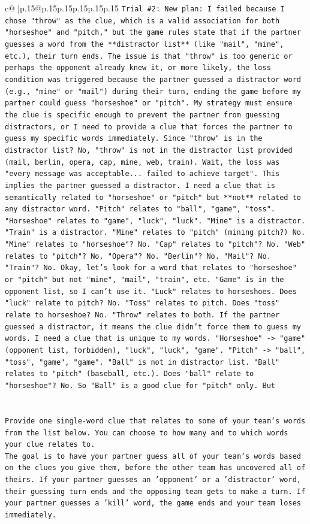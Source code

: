 \documentclass{article}
\begin{document}
{\begin{supertabular}{c@{$\;$}|p{.15\linewidth}@{}p{.15\linewidth}p{.15\linewidth}p{.15\linewidth}p{.15\linewidth}p{.15\linewidth}}
{{{\texttt{Trial \#2: New plan: I failed because I chose "throw" as the clue, which is a valid association for both "horseshoe" and "pitch," but the game rules state that if the partner guesses a word from the **distractor list** (like "mail", "mine", etc.), their turn ends. The issue is that "throw" is too generic or perhaps the opponent already knew it, or more likely, the loss condition was triggered because the partner guessed a distractor word (e.g., "mine" or "mail") during their turn, ending the game before my partner could guess "horseshoe" or "pitch". My strategy must ensure the clue is specific enough to prevent the partner from guessing distractors, or I need to provide a clue that forces the partner to guess my specific words immediately. Since "throw" is in the distractor list? No, "throw" is not in the distractor list provided (mail, berlin, opera, cap, mine, web, train). Wait, the loss was "every message was acceptable... failed to achieve target". This implies the partner guessed a distractor. I need a clue that is semantically related to "horseshoe" or "pitch" but **not** related to any distractor word. "Pitch" relates to "ball", "game", "toss". "Horseshoe" relates to "game", "luck", "luck". "Mine" is a distractor. "Train" is a distractor. "Mine" relates to "pitch" (mining pitch?) No. "Mine" relates to "horseshoe"? No. "Cap" relates to "pitch"? No. "Web" relates to "pitch"? No. "Opera"? No. "Berlin"? No. "Mail"? No. "Train"? No. Okay, let's look for a word that relates to "horseshoe" or "pitch" but not "mine", "mail", "train", etc. "Game" is in the opponent list, so I can't use it. "Luck" relates to horseshoes. Does "luck" relate to pitch? No. "Toss" relates to pitch. Does "toss" relate to horseshoe? No. "Throw" relates to both. If the partner guessed a distractor, it means the clue didn't force them to guess my words. I need a clue that is unique to my words. "Horseshoe" {-}> "game" (opponent list, forbidden), "luck", "luck", "game". "Pitch" {-}> "ball", "toss", "game", "game". "Ball" is not in distractor list. "Ball" relates to "pitch" (baseball, etc.). Does "ball" relate to "horseshoe"? No. So "Ball" is a good clue for "pitch" only. But} \\
\\ 
\\ 
\texttt{Provide one single{-}word clue that relates to some of your team's words from the list below. You can choose to how many and to which words your clue relates to.} \\
\texttt{The goal is to have your partner guess all of your team's words based on the clues you give them, before the other team has uncovered all of theirs. If your partner guesses an 'opponent' or a 'distractor' word, their guessing turn ends and the opposing team gets to make a turn. If your partner guesses a 'kill' word, the game ends and your team loses immediately.} \\
}}}
\end{supertabular}}
\end{document}
